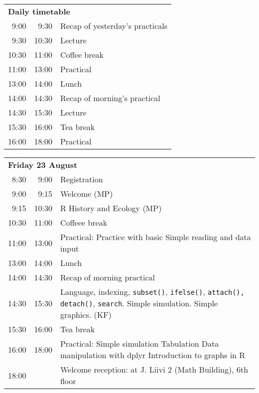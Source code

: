 \noindent
\begin{tabular}{r@{ -- }rp{13cm}}
\multicolumn{3}{l}{\bf Daily timetable} \\
 9:00 &  9:30 & Recap of yesterday's practicals \\
 9:30 & 10:30 & Lecture \\
10:30 & 11:00 & Coffee break \\
11:00 & 13:00 & Practical \\
13:00 & 14:00 & Lunch \\
14:00 & 14:30 & Recap of morning's practical \\
14:30 & 15:30 & Lecture \\
15:30 & 16:00 & Tea break \\
16:00 & 18:00 & Practical \\[2em]
\end{tabular}

\noindent
\begin{tabular}{r@{ -- }rp{13cm}}
\multicolumn{3}{l}{\bf Friday 23 August} \\
 8:30 &  9:00 & Registration \\
 9:00 &  9:15 & Welcome (MP) \\
 9:15 & 10:30 & R History and Ecology (MP) \\
10:30 & 11:00 & Coffeee break \\
11:00 & 13:00 & Practical:
                Practice with basic \R \newline
                Simple reading and data input \\
13:00 & 14:00 & Lunch \\
14:00 & 14:30 & Recap of morning practical \\
14:30 & 15:30 & Language, indexing,
                {\tt subset()}, {\tt ifelse()},
                \texttt{attach(), detach()},
                \texttt{search}. Simple simulation. Simple graphics. (KF)\\
15:30 & 16:00 & Tea break\\
16:00 & 18:00 & Practical: Simple simulation \newline
                Tabulation\newline
                Data manipulation with dplyr\newline
                Introduction to graphs in R \\
18:00 &       & Welcome reception: at J. Liivi 2 (Math Building), 6th floor \\[1em]
\end{tabular}

